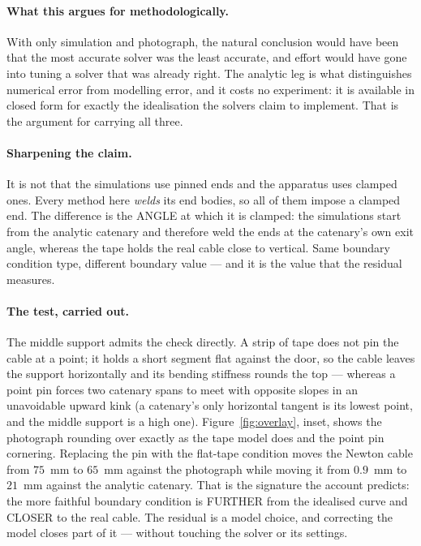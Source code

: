 \documentclass[11pt,a4paper]{article}
\begin{document}
\paragraph{What this argues for methodologically.} With only simulation and
photograph, the natural conclusion would have been that the most accurate
solver was the least accurate, and effort would have gone into tuning a solver
that was already right. The analytic leg is what distinguishes numerical error
from modelling error, and it costs no experiment: it is available in closed
form for exactly the idealisation the solvers claim to implement. That is the
argument for carrying all three.

\paragraph{Sharpening the claim.} It is not that the simulations use pinned
ends and the apparatus uses clamped ones. Every method here \emph{welds} its
end bodies, so all of them impose a clamped end. The difference is the ANGLE at
which it is clamped: the simulations start from the analytic catenary and
therefore weld the ends at the catenary's own exit angle, whereas the tape
holds the real cable close to vertical. Same boundary condition type, different
boundary value --- and it is the value that the residual measures.

\paragraph{The test, carried out.} The middle support admits the check directly. A strip of tape does not pin the cable at a point; it holds a short segment flat against the door, so the cable leaves the support horizontally and its bending stiffness rounds the top --- whereas a point pin forces two catenary spans to meet with opposite slopes in an unavoidable upward kink (a catenary's only horizontal tangent is its lowest point, and the middle support is a high one). Figure~\ref{fig:overlay}, inset, shows the photograph rounding over exactly as the tape model does and the point pin cornering. Replacing the pin with the flat-tape condition moves the Newton cable from $75$~mm to $65$~mm against the photograph while moving it from $0.9$~mm to $21$~mm against the analytic catenary. That is the signature the account predicts: the more faithful boundary condition is FURTHER from the idealised curve and CLOSER to the real cable. The residual is a model choice, and correcting the model closes part of it --- without touching the solver or its settings.
\end{document}
